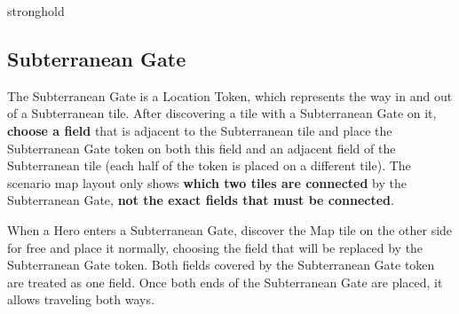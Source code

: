 \begin{multicols*}{2}
\begin{expansion}{stronghold}
\bigskip
\begin{center}
  \begin{scriptsize}
    \centering
  \end{scriptsize}
\end{center}

\subsection*{Subterranean Gate}
The Subterranean Gate is a Location Token, which represents the way in and out of a Subterranean tile. After discovering a tile with a Subterranean Gate on it, \textbf{choose a field} that is adjacent to the Subterranean tile and place the Subterranean Gate token on both this field and an adjacent field of the Subterranean tile (each half of the token is placed on a different tile). The scenario map layout only shows \textbf{which two tiles are connected} by the Subterranean Gate, \textbf{not the exact fields that must be connected}.\par
When a Hero enters a Subterranean Gate, discover the Map tile on the other side for free and place it normally, choosing the field that will be replaced by the Subterranean Gate token.
Both fields covered by the Subterranean Gate token are treated as one field. Once both ends of the Subterranean Gate are placed, it allows traveling both ways.

\end{expansion}


\end{multicols*}
